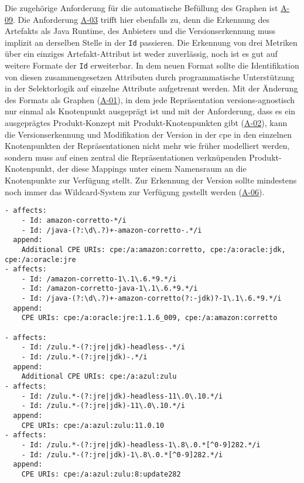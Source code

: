 Die zugehörige Anforderung für die automatische Befüllung des Graphen ist \hyperref[subsec:req-generated-data]{A-09}.
Die Anforderung \hyperref[subsec:req-type-specific-matching]{A-03} trifft hier ebenfalls zu, denn die Erkennung des Artefakts als Java Runtime, des Anbieters und die Versionserkennung muss implizit an derselben Stelle in der \texttt{Id} passieren.
Die Erkennung von drei Metriken über ein einziges Artefakt-Attribut ist weder zuverlässig, noch ist es gut auf weitere Formate der \texttt{Id} erweiterbar.
In dem neuen Format sollte die Identifikation von diesen zusammengesetzen Attributen durch programmatische Unterstützung in der Selektorlogik auf einzelne Attribute aufgetrennt werden.
Mit der Änderung des Formats als Graphen (\hyperref[subsec:req-format-product-graph]{A-01}), in dem jede Repräsentation versions-agnostisch nur einmal als Knotenpunkt ausgeprägt ist und mit der Anforderung, dass es ein ausgeprägtes Produkt-Konzept mit Produkt-Knotenpunkten gibt (\hyperref[subsec:req-product-concept]{A-02}), kann die Versionserkennung und Modifikation der Version in der \acrshort{cpe} in den einzelnen Knotenpunkten der Repräsentationen nicht mehr wie früher modelliert werden, sondern muss auf einen zentral die Repräsentationen verknüpenden Produkt-Knotenpunkt, der diese Mappings unter einem Namensraum an die Knotenpunkte zur Verfügung stellt.
Zur Erkennung der Version sollte mindestens noch immer das Wildcard-System zur Verfügung gestellt werden (\hyperref[subsec:req-regex-support]{A-06}).

\begin{lstlisting}[style=yaml,caption={Java-Runtime-Korrelation mit Versionstransformation},label={lst:reference-case-java-runtimes},basicstyle=\ttfamily\scriptsize]
- affects:
    - Id: amazon-corretto-*/i
    - Id: /java-(?:\d\.?)+-amazon-corretto-.*/i
  append:
    Additional CPE URIs: cpe:/a:amazon:corretto, cpe:/a:oracle:jdk, cpe:/a:oracle:jre
- affects:
    - Id: /amazon-corretto-1\.1\.6.*9.*/i
    - Id: /amazon-corretto-java-1\.1\.6.*9.*/i
    - Id: /java-(?:\d\.?)+-amazon-corretto(?:-jdk)?-1\.1\.6.*9.*/i
  append:
    CPE URIs: cpe:/a:oracle:jre:1.1.6_009, cpe:/a:amazon:corretto

- affects:
    - Id: /zulu.*-(?:jre|jdk)-headless-.*/i
    - Id: /zulu.*-(?:jre|jdk)-.*/i
  append:
    Additional CPE URIs: cpe:/a:azul:zulu
- affects:
    - Id: /zulu.*-(?:jre|jdk)-headless-11\.0\.10.*/i
    - Id: /zulu.*-(?:jre|jdk)-11\.0\.10.*/i
  append:
    CPE URIs: cpe:/a:azul:zulu:11.0.10
- affects:
    - Id: /zulu.*-(?:jre|jdk)-headless-1\.8\.0.*[^0-9]282.*/i
    - Id: /zulu.*-(?:jre|jdk)-1\.8\.0.*[^0-9]282.*/i
  append:
    CPE URIs: cpe:/a:azul:zulu:8:update282
\end{lstlisting}

